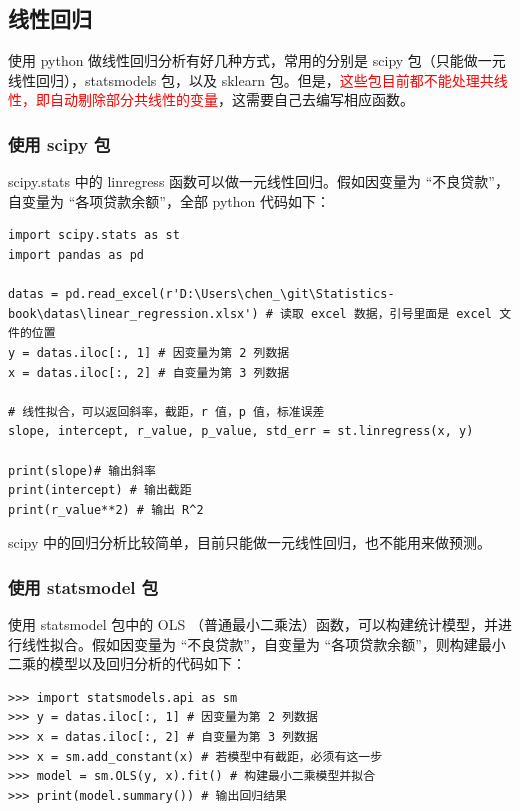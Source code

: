 \subsection{线性回归}

使用 python 做线性回归分析有好几种方式，常用的分别是 scipy 包（只能做一元线性回归），statsmodels 包，以及 sklearn 包。但是，\textcolor{red}{这些包目前都不能处理共线性，即自动剔除部分共线性的变量}，这需要自己去编写相应函数。

\subsubsection{使用 scipy 包}

scipy.stats 中的 linregress 函数可以做一元线性回归。假如因变量为 “不良贷款”，自变量为 “各项贷款余额”，全部 python 代码如下：

\begin{lstlisting}[Language=Python]
import scipy.stats as st
import pandas as pd

datas = pd.read_excel(r'D:\Users\chen_\git\Statistics-book\datas\linear_regression.xlsx') # 读取 excel 数据，引号里面是 excel 文件的位置
y = datas.iloc[:, 1] # 因变量为第 2 列数据
x = datas.iloc[:, 2] # 自变量为第 3 列数据

# 线性拟合，可以返回斜率，截距，r 值，p 值，标准误差
slope, intercept, r_value, p_value, std_err = st.linregress(x, y)

print(slope)# 输出斜率
print(intercept) # 输出截距
print(r_value**2) # 输出 R^2
\end{lstlisting}


scipy 中的回归分析比较简单，目前只能做一元线性回归，也不能用来做预测。

\subsubsection{使用 statsmodel 包}

使用 statsmodel 包中的 OLS （普通最小二乘法）函数，可以构建统计模型，并进行线性拟合。假如因变量为 “不良贷款”，自变量为 “各项贷款余额”，则构建最小二乘的模型以及回归分析的代码如下：

\begin{lstlisting}[Language=Python]
>>> import statsmodels.api as sm
>>> y = datas.iloc[:, 1] # 因变量为第 2 列数据
>>> x = datas.iloc[:, 2] # 自变量为第 3 列数据
>>> x = sm.add_constant(x) # 若模型中有截距，必须有这一步
>>> model = sm.OLS(y, x).fit() # 构建最小二乘模型并拟合
>>> print(model.summary()) # 输出回归结果
\end{lstlisting}

